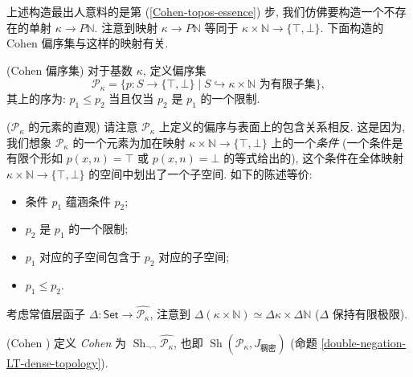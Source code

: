 
上述构造最出人意料的是第 (\ref{Cohen-topos-essence}) 步, 我们仿佛要构造一个不存在的单射 $\kappa\to P\mathbb{N}$. 注意到映射 $\kappa\to P\mathbb{N}$ 等同于 $\kappa\times\mathbb{N}\to \{\top,\bot\}$. 下面构造的 Cohen 偏序集与这样的映射有关.

\begin{definition}
	{(Cohen 偏序集)}
	对于基数 $\kappa$, 定义偏序集
	$$
	\mathcal P_\kappa = \big\{p\colon S\to \{\top,\bot\}\mid \text{$S\hookrightarrow\kappa\times \mathbb{N}$ 为有限子集}\big\},
	$$
	其上的序为: $p_1 \leq p_2$ 当且仅当 $p_2$ 是 $p_1$ 的一个限制.
\end{definition}
\begin{remark}
	[label={P-kappa-finite-condition}]
	{($\mathcal P_\kappa$ 的元素的直观)}
	请注意 $\mathcal P_\kappa$ 上定义的偏序与表面上的包含关系相反. 这是因为, 我们想象 $\mathcal P_\kappa$ 的一个元素为加在映射 $\kappa\times\mathbb{N}\to \{\top,\bot\}$ 上的一个\emph{条件} (一个条件是有限个形如 $p(x,n)=\top$ 或 $p(x,n)=\bot$ 的等式给出的), 这个条件在全体映射 $\kappa\times\mathbb{N}\to \{\top,\bot\}$ 的空间中划出了一个子空间. 如下的陈述等价:
	\begin{itemize}
		\item 条件 $p_1$ 蕴涵条件 $p_2$;
		\item $p_2$ 是 $p_1$ 的一个限制;
		\item $p_1$ 对应的子空间包含于 $p_2$ 对应的子空间;
		\item $p_1\leq p_2$.
	\end{itemize}
\end{remark}

考虑常值层函子 $\Delta\colon \mathsf {Set} \to \widehat {\mathcal P_\kappa}$, 注意到 $\Delta(\kappa\times\mathbb{N})\simeq\Delta\kappa\times\Delta\mathbb{N}$ ($\Delta$ 保持有限极限).

\begin{definition}
	{(Cohen \topos{})}
	定义 \emph{Cohen \topos{}}为 $\operatorname{Sh}_{\neg\neg}\widehat {\mathcal P_{\kappa}}$, 也即 $\operatorname{Sh}(\mathcal P_\kappa,J_{\text{稠密}})$ (命题 \ref{double-negation-LT-dense-topology}).
\end{definition}


